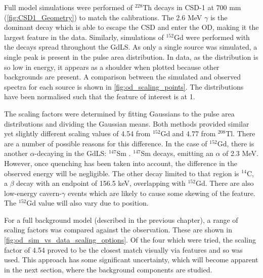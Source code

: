 \par
Full model simulations were performed of ${}^{228}$Th decays in CSD-1 at 700 mm (\autoref{fig:CSD1_Geometry}) to match the calibrations.
The 2.6 MeV $\gamma$ is the dominant decay which is able to escape the CSD and enter the OD, making it the largest feature in the data.
Similarly, simulations of ${}^{152}$Gd were performed with the decays spread throughout the GdLS.
As only a single source was simulated, a single peak is present in the pulse area distribution.
In data, as the distribution is so low in energy, it appears as a shoulder when plotted because other backgrounds are present.
A comparison between the simulated and observed spectra for each source is shown in \autoref{fig:od_scaling_points}.
The distributions have been normalised such that the feature of interest is at 1.

\par
The scaling factors were determined by fitting Gaussians to the pulse area distributions and dividing the Gaussian means.
Both methods provided similar yet slightly different scaling values of 4.54 from ${}^{152}$Gd and 4.77 from ${}^{208}$Tl.
There are a number of possible reasons for this difference.
In the case of ${}^{152}$Gd, there is another $\alpha$-decaying in the GdLS: ${}^{147}$Sm \cite{scotthaselschwardt_thesis_ref}.
${}^{147}$Sm decays, emitting an $\alpha$ of 2.3 MeV. 
However, once quenching has been taken into account, the difference in the observed energy will be negligible.
The other decay limited to that region is ${}^{14}$C, a $\beta$ decay with an endpoint of 156.5 keV, overlapping with ${}^{152}$Gd.
There are also low-energy cavern-$\gamma$ events which are likely to cause some skewing of the feature.
The ${}^{152}$Gd value will also vary due to position.

\par
For a full background model (described in the previous chapter), a range of scaling factors was compared against the observation.
These are shown in \autoref{fig:od_sim_vs_data_scaling_options}.
Of the four which were tried, the scaling factor of 4.54 proved to be the closest match visually via features and so was used.
This approach has some significant uncertainty, which will become apparent in the next section, where the background components are studied.






